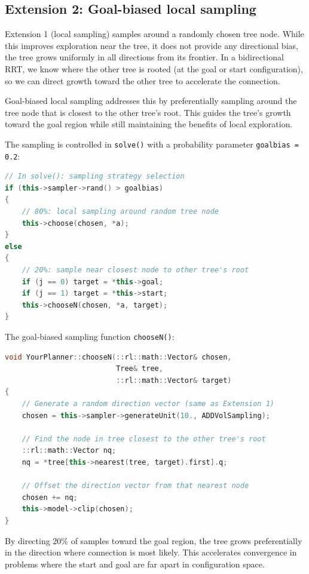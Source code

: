 \documentclass[a4paper,12pt]{article}
\begin{document}
\subsection*{Extension 2: Goal-biased local sampling} %
Extension 1 (local sampling) samples around a randomly chosen tree node. While this improves exploration near the tree, it does not provide any directional bias, the tree grows uniformly in all directions from its frontier. In a bidirectional RRT, we know where the other tree is rooted (at the goal or start configuration), so we can direct growth toward the other tree to accelerate the connection.

Goal-biased local sampling addresses this by preferentially sampling around the tree node that is closest to the other tree's root. This guides the tree's growth toward the goal region while still maintaining the benefits of local exploration.

The sampling is controlled in \texttt{solve()} with a probability parameter \texttt{goalbias = 0.2}:

\begin{lstlisting}[language=C++]
// In solve(): sampling strategy selection
if (this->sampler->rand() > goalbias)
{
    // 80%: local sampling around random tree node
    this->choose(chosen, *a);
}
else
{
    // 20%: sample near closest node to other tree's root
    if (j == 0) target = *this->goal;
    if (j == 1) target = *this->start;
    this->chooseN(chosen, *a, target);
}
\end{lstlisting}

The goal-biased sampling function \texttt{chooseN()}:

\begin{lstlisting}[language=C++, caption=Implementation of Extension 2]
void YourPlanner::chooseN(::rl::math::Vector& chosen,
                          Tree& tree,
                          ::rl::math::Vector& target)
{
    // Generate a random direction vector (same as Extension 1)
    chosen = this->sampler->generateUnit(10., ADDVolSampling);

    // Find the node in tree closest to the other tree's root
    ::rl::math::Vector nq;
    nq = *tree[this->nearest(tree, target).first].q;

    // Offset the direction vector from that nearest node
    chosen += nq;
    this->model->clip(chosen);
}
\end{lstlisting}

By directing 20\% of samples toward the goal region, the tree grows preferentially in the direction where connection is most likely. This accelerates convergence in problems where the start and goal are far apart in configuration space.
\end{document}
